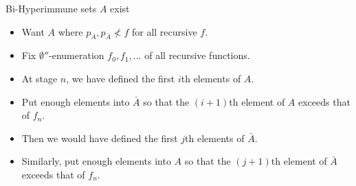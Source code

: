 \begin{frame}{Bi-Hyperimmune sets $A$ exist}
  \begin{itemize}
    \item Want $A$ where $p_A,p_{\bar{A}}\not<f$ for all recursive $f$.
    \item Fix $\emptyset''$-enumeration $f_0,f_1,\ldots$ of all recursive
      functions.
    \item At stage $n$, we have defined the first $i$th elements of $A$.
    \item Put enough elements into $\bar{A}$ so that the $(i+1)$th element
      of $A$ exceeds that of $f_n$.
    \item Then we would have defined the first $j$th elements of $\bar{A}$.
    \item Similarly, put enough elements into $A$ so that the $(j+1)$th
      element of $\bar{A}$ exceeds that of $f_n$.
  \end{itemize}
\end{frame}
